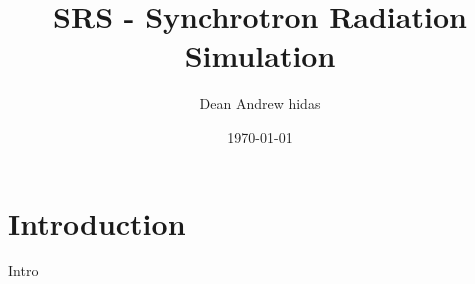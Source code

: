 \documentclass[12pt,letterpaper]{article}
\date{\today}
\author{Dean Andrew hidas}
\title{SRS - Synchrotron Radiation Simulation}
\begin{document}
\maketitle
{}

\section{Introduction}
Intro
\end{document}
